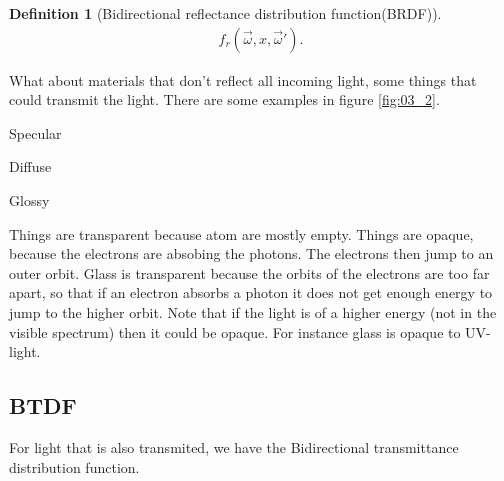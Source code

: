 \documentclass[10pt]{armath}
\numberwithin{equation}{section}
\newenvironment{Figure}
{\par\medskip\noindent\minipage{\linewidth}}
{\endminipage\par\medskip}
\theoremstyle{definition}
\newtheorem{definition}{Definition}[section]
\begin{document}
\begin{multicols}{2}
\begin{definition}[Bidirectional reflectance distribution function(BRDF)]
  \begin{align*}
    f_r\left(\vec{\omega},x,\vec{\omega}'\right).
  \end{align*}
\end{definition}

What about materials that don't reflect all incoming light, some things that
could transmit the light. There are some examples in figure \ref{fig:03_2}.

\begin{Figure}
  \begin{center}
    \centering
    \begin{minipage}{0.3\textwidth}
      \begin{center}
        
        Specular
      \end{center}
    \end{minipage}
    \begin{minipage}{0.3\textwidth}
      \begin{center}
        
        Diffuse
      \end{center}
    \end{minipage}
    \begin{minipage}{0.3\textwidth}
      \begin{center}
        
        Glossy
      \end{center}
    \end{minipage}
  \end{center}
  \label{fig:03_2}
\end{Figure}

Things are transparent because atom are mostly empty. Things are opaque,
because the electrons are absobing the photons. The electrons then jump to an
outer orbit. Glass is transparent because the orbits of the electrons are too
far apart, so that if an electron absorbs a photon it does not get enough
energy to jump to the higher orbit. Note that if the light is of a higher
energy (not in the visible spectrum) then it could be opaque. For instance
glass is opaque to UV-light.

\subsection{BTDF}%
\label{sub:btdf}

For light that is also transmited, we have the Bidirectional transmittance
distribution function.


\end{multicols}
\end{document}
